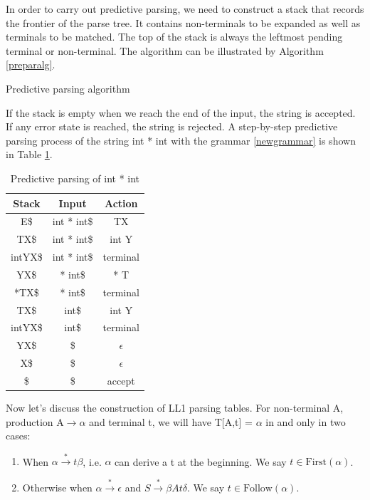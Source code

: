 In order to carry out predictive parsing, we need to construct a stack that records the frontier of the parse tree. It contains non-terminals to be expanded as well as terminals to be matched. The top of the stack is always the leftmost pending terminal or non-terminal. The algorithm can be illustrated by Algorithm \eqref{preparalg}.
\begin{algorithm}
\caption{Predictive parsing algorithm}\label{preparalg}

\begin{algorithmic}
\Repeat
{}
		 \EndIf \endcase
		 \EndIf \endcase
\endswitch
{}
\end{algorithmic}
\end{algorithm} 
If the stack is empty when we reach the end of the input, the string is accepted. If any error state is reached, the string is rejected. A step-by-step predictive parsing process of the string {\sf int * int} with the grammar \eqref{newgrammar} is shown in Table \ref{preparex}.
\begin{table}[ht]
\centering
\caption{Predictive parsing of int * int}\label{preparex}
\begin{tabular}{ccc}
\hline
Stack & Input & Action\\\hline
E\$ & int * int\$ & TX \\
TX\$ & int * int\$ & int Y\\
intYX\$ & int * int\$ & terminal\\
YX\$ & * int\$ & * T\\
*TX\$ & * int\$ & terminal\\
TX\$ & int\$ & int Y\\
intYX\$ & int\$ & terminal\\
YX\$ & \$ & $\epsilon$\\
X\$ & \$ & $\epsilon$\\
\$ & \$ & accept\\\hline
\end{tabular}
\end{table}

Now let's discuss the construction of LL1 parsing tables. For non-terminal A, production A$\rightarrow\alpha$ and terminal t, we will have T[A,t] = $\alpha$ in and only in two cases:
\begin{enumerate}
\item When $\alpha\xrightarrow{*}t\beta$, i.e. $\alpha$ can derive a t at the beginning. We say $t\in\text{First}(\alpha)$.
\item Otherwise when $\alpha\xrightarrow{*}\epsilon$ and $S\xrightarrow{*}\beta At\delta$. We say $t\in\text{Follow}(\alpha)$.
\end{enumerate}
